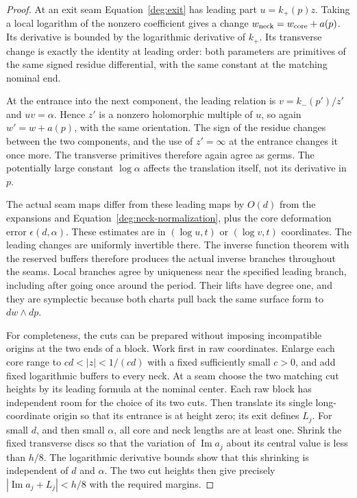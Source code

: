 \begin{proof}
At an exit seam Equation~\eqref{deg:exit} has leading part
$u=k_+(p)z$.  Taking a local logarithm of the nonzero coefficient
gives a change $w_{\rm neck}=w_{\rm core}+a(p)$.  Its derivative
is bounded by the logarithmic derivative of $k_+$.  Its transverse
change is exactly the identity at leading order: both parameters
are primitives of the same signed residue differential, with
the same constant at the matching nominal end.

At the entrance into the next component, the leading relation is
$v=k_-(p')/z'$ and $uv=\alpha$.  Hence $z'$ is a nonzero
holomorphic multiple of $u$, so again $w'=w+a(p)$, with the same
orientation.  The sign of the residue changes between the two
components, and the use of $z'=\infty$ at the entrance changes
it once more.  The transverse primitives therefore again agree
as germs.  The potentially large constant $\log\alpha$ affects
the translation itself, not its derivative in $p$.

The actual seam maps differ from these leading maps by $O(d)$
from the expansions and Equation~\eqref{deg:neck-normalization},
plus the core deformation error $\epsilon(d,\alpha)$.  These
estimates are in $(\log u,t)$ or $(\log v,t)$ coordinates.  The
leading changes are uniformly invertible there.  The inverse
function theorem with the reserved buffers therefore produces
the actual inverse branches throughout the seams.  Local branches
agree by uniqueness near the specified leading branch, including
after going once around the period.  Their lifts have degree one,
and they are symplectic because both charts pull back the same
surface form to $dw\wedge dp$.

For completeness, the cuts can be prepared without imposing
incompatible origins at the two ends of a block.  Work first in
raw coordinates.  Enlarge each core range to
$cd<|z|<1/(cd)$ with a fixed sufficiently small $c>0$, and add
fixed logarithmic buffers to every neck.  At a seam choose the
two matching cut heights by its leading formula at the nominal
center.  Each raw block has independent room for the choice of
its two cuts.  Then translate its single long-coordinate origin
so that its entrance is at height zero; its exit defines $L_j$.
For small $d$, and then small $\alpha$, all core and neck lengths
are at least one.  Shrink the fixed transverse discs so that
the variation of $\operatorname{Im}a_j$ about its central value
is less than $h/8$.  The logarithmic derivative bounds show that
this shrinking is independent of $d$ and $\alpha$.  The two
cut heights then give precisely
$|\operatorname{Im}a_j+L_j|<h/8$ with the required margins.
\end{proof}

